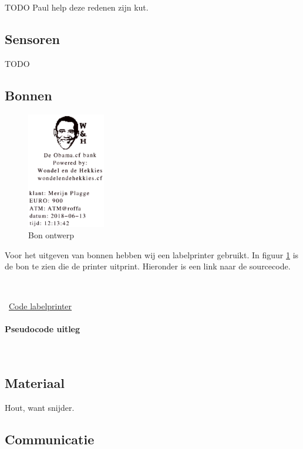 \documentclass{article}
\begin{document}
TODO Paul help deze redenen zijn kut.

\newpage

\subsection{Sensoren}

TODO

\newpage
\subsection{Bonnen}

\begin{figure}
        \centering
        \includegraphics[height=2.0in]{obama_bon.pdf}
       \caption{Bon ontwerp}
       \label{fig: Bon ontwerp}
\end{figure}

Voor het uitgeven van bonnen hebben wij een labelprinter gebruikt.
In figuur \ref{fig: Bon ontwerp} is de bon te zien die de printer uitprint.
Hieronder is een link naar de sourcecode.

\vspace{1mm}\

\Mundus~\href{https://github.com/Gewad/Project4Bankalicious/tree/master/bonnetjesPrinten}{Code labelprinter}

\paragraph{Pseudocode uitleg}\ 



\newpage

\subsection{Materiaal}

Hout, want snijder.

\newpage

\subsection{Communicatie}
\end{document}
